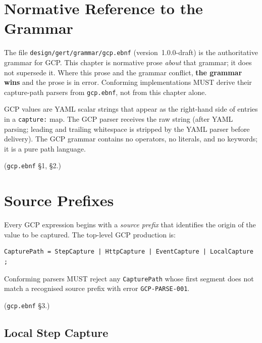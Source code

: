 \section{Normative Reference to the Grammar}
\label{sec:gcp:normref}

The file \texttt{design/gert/grammar/gcp.ebnf} (version~1.0.0-draft) is the
authoritative grammar for GCP\@.  This chapter is normative prose \emph{about}
that grammar; it does not supersede it.  Where this prose and the grammar
conflict, \textbf{the grammar wins} and the prose is in error.  Conforming
implementations MUST derive their capture-path parsers from
\texttt{gcp.ebnf}, not from this chapter alone.

GCP values are YAML scalar strings that appear as the right-hand side of
entries in a \texttt{capture:} map.
The GCP parser receives the raw string (after YAML parsing; leading and
trailing whitespace is stripped by the YAML parser before delivery).
The GCP grammar contains no operators, no literals, and no keywords;
it is a pure path language.

(\texttt{gcp.ebnf} \S1, \S2.)

\section{Source Prefixes}
\label{sec:gcp:sources}

Every GCP expression begins with a \emph{source prefix} that identifies
the origin of the value to be captured.
The top-level GCP production is:

\begin{verbatim}
CapturePath = StepCapture | HttpCapture | EventCapture | LocalCapture ;
\end{verbatim}

Conforming parsers MUST reject any \texttt{CapturePath} whose first
segment does not match a recognised source prefix with error
\texttt{GCP-PARSE-001}.

(\texttt{gcp.ebnf} \S3.)

\subsection{Local Step Capture}
\label{subsec:gcp:sources:local}

